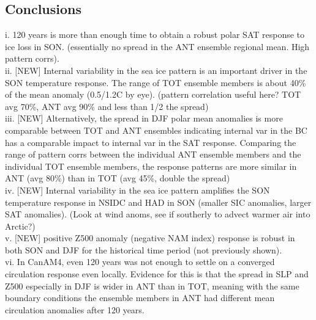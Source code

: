 \documentclass[twocol]{ametsoc}
\begin{document}
\subsection{Conclusions}

i. 120 years is more than enough time to obtain a robust polar SAT response to ice loss in SON. (essentially no spread in the ANT ensemble regional mean. High pattern corrs). \\
ii. [NEW] Internal variability in the sea ice pattern is an important driver in the SON temperature response. The range of TOT ensemble members is about 40\% of the mean anomaly (0.5/1.2C by eye). (pattern correlation useful here? TOT avg 70\%, ANT avg 90\% and less than 1/2 the spread)\\
iii. [NEW] Alternatively, the spread in DJF polar mean anomalies is more comparable between TOT and ANT ensembles indicating internal var in the BC has a comparable impact to internal var in the SAT response. Comparing the range of pattern corrs between the individual ANT ensemble members and the individual TOT ensemble members, the response patterns are more similar in ANT (avg 80\%) than in TOT (avg 45\%, double the spread) \\
iv. [NEW] Internal variability in the sea ice pattern amplifies the SON temperature response in NSIDC and HAD in SON (smaller SIC anomalies, larger SAT anomalies). (Look at wind anoms, see if southerly to advect warmer air into Arctic?)\\
v. [NEW] positive Z500 anomaly (negative NAM index) response is robust in both SON and DJF for the historical time period (not previously shown).\\
vi. In CanAM4, even 120 years was not enough to settle on a converged circulation response even locally. Evidence for this is that the spread in SLP and Z500 especially in DJF is wider in ANT than in TOT, meaning with the same boundary conditions the ensemble members in ANT had different mean circulation anomalies after 120 years.\\
\end{document}

